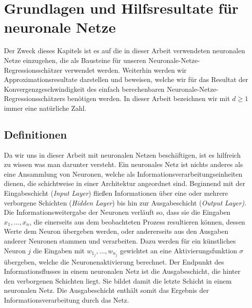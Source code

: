 \chapter{Grundlagen und Hilfsresultate für neuronale Netze}
\label{chap:1}

Der Zweck dieses Kapitels ist es auf die in dieser Arbeit verwendeten neuronalen Netze einzugehen, die als Bausteine für unseren Neuronale-Netze-Regressionsschätzer verwendet werden. Weiterhin werden wir Approximationsresultate darstellen und beweisen, welche wir für das Resultat der Konvergenzgeschwindigkeit des einfach berechenbaren Neuronale-Netze-Regressionsschätzers benötigen werden.
In dieser Arbeit bezeichnen wir mit $d \geq 1$ immer eine natürliche Zahl.

\section{Definitionen}
Da wir uns in dieser Arbeit mit neuronalen Netzen beschäftigen, ist es hilfreich zu wissen was man darunter versteht. Ein neuronales Netz ist nichts anderes als eine Ansammlung von Neuronen, welche als Informationsverarbeitungseinheiten dienen, die schichtweise in einer Architektur angeordnet sind. Beginnend mit der Eingabeschicht (\textit{Input Layer}) fließen Informationen über eine oder mehrere verborgene Schichten (\textit{Hidden Layer}) bis hin zur Ausgabeschicht (\textit{Output Layer)}. Die Informationsweitergabe der Neuronen verläuft so, dass sie die Eingaben $x_1,\dots,x_n$, die einerseits aus dem beobachteten Prozess resultieren können, dessen Werte dem Neuron übergeben werden, oder andererseits aus den Ausgaben anderer Neuronen stammen und verarbeiten.
Dazu werden für ein künstliches Neuron $j$ die Eingaben mit $w_{1_j}, \dots, w_{n_j}$ gewichtet an eine Aktivierungsfunktion $\sigma$ übergeben, welche die Neuronenaktivierung berechnet. Der Endpunkt des Informationsflusses in einem neuronalen Netz ist die Ausgabeschicht, die hinter den verborgenen Schichten liegt. Sie bildet damit die letzte Schicht in einem neuronalen Netz. Die Ausgabeschicht enthält somit das Ergebnis der Informationsverarbeitung durch das Netz.  
